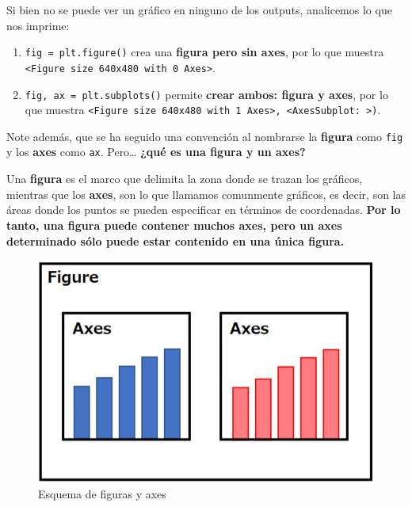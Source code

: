 \documentclass[
  letterpaper,
  DIV=11,
  numbers=noendperiod]{scrreprt}
\providecommand{\tightlist}{%
  \setlength{\itemsep}{0pt}\setlength{\parskip}{0pt}}\usepackage{longtable,booktabs,array}
\begin{document}
Si bien no se puede ver un gráfico en ninguno de los outputs, analicemos
lo que nos imprime:

\begin{enumerate}
\def\labelenumi{\arabic{enumi}.}
\tightlist
\item
  \texttt{fig\ =\ plt.figure()} crea una \textbf{figura pero sin axes},
  por lo que muestra
  \texttt{\textless{}Figure\ size\ 640x480\ with\ 0\ Axes\textgreater{}}.
\item
  \texttt{fig,\ ax\ =\ plt.subplots()} permite \textbf{crear ambos:
  figura y axes}, por lo que muestra
  \texttt{\textless{}Figure\ size\ 640x480\ with\ 1\ Axes\textgreater{},\ \textless{}AxesSubplot:\ \textgreater{})}.
\end{enumerate}

Note además, que se ha seguido una convención al nombrarse la
\textbf{figura} como \texttt{fig} y los \textbf{axes} como \texttt{ax}.
Pero\ldots{} \textbf{¿qué es una figura y un axes?}

Una \textbf{figura} es el marco que delimita la zona donde se trazan los
gráficos, mientras que los \textbf{axes}, son lo que llamamos comunmente
gráficos, es decir, son las áreas donde los puntos se pueden especificar
en términos de coordenadas. \textbf{Por lo tanto, una figura puede
contener muchos axes, pero un axes determinado sólo puede estar
contenido en una única figura.}

\begin{figure}[H]

{\centering \includegraphics{./imgs/unidad_6/fig_ax.png}

}

\caption{Esquema de figuras y axes}

\end{figure}%
\end{document}
